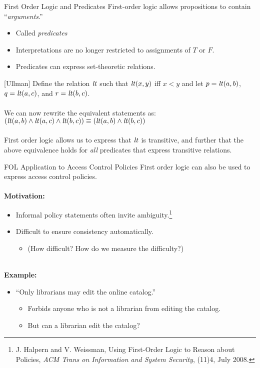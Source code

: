\documentclass[style=sailor,size=12pt]{powerdot}
\begin{document}
\begin{wideslide}[bm=,toc=]{First Order Logic and Predicates}
First-order logic allows propositions to contain ``\emph{arguments}.''
\begin{itemize}
\item<2-> Called \emph{predicates}
\item<3->Interpretations are no longer restricted to assignments of $T$ or $F$.
\item<4->Predicates can express set-theoretic relations.
\end{itemize}
\pause[4]
\begin{ex}{}[Ullman]
Define the relation $\mbox{\it lt\/}$ such that $\mbox{\it lt\/}(x,y)$ iff $x < y$ and 
let $p = \mbox{\it lt\/}(a,b)$, $q = \mbox{\it lt\/}(a,c)$, and $r = \mbox{\it lt\/}(b,c)$.
\\~\\
\pause
We can now rewrite the equivalent statements as:\\
$(\mbox{\it lt\/}(a,b) \land \mbox{\it lt\/}(a,c) \land \mbox{\it lt\/}(b,c)) \equiv (\mbox{\it lt\/}(a,b) \land \mbox{\it lt\/}(b,c))$
\\~\\
\pause
First order logic allows us to express that $\mbox{\it lt\/}$ is transitive, and further that the above
equivalence holds for \emph{all} predicates that express transitive relations.
\end{ex}
\end{wideslide}

\begin{wideslide}[bm=,toc=]{FOL Application to Access Control Policies}
First order logic can also be used to express access control policies.
\\~\\
\pause
\textbf{Motivation:} 
\begin{itemize}
\item Informal policy statements often invite ambiguity.\footnote{ \footnotesize
J. Halpern and V. Weissman, 
Using First-Order Logic to Reason about Policies, {\em ACM Trans on Information and System Security\/},
(11)4, July 2008.}
\item Difficult to ensure consistency automatically. \pause
\begin{itemize}
\item (How difficult? How do we measure the difficulty?) 
\end{itemize}
\end{itemize}
\pause
~\\
\textbf{Example:} 
\begin{itemize}
\item ``Only librarians may edit the online catalog.''
\begin{itemize}
\item<5-> Forbids anyone who is not a librarian from editing the catalog.
\item<6-> But can a librarian edit the catalog?
\end{itemize}
\end{itemize}
\end{wideslide}
\end{document}
